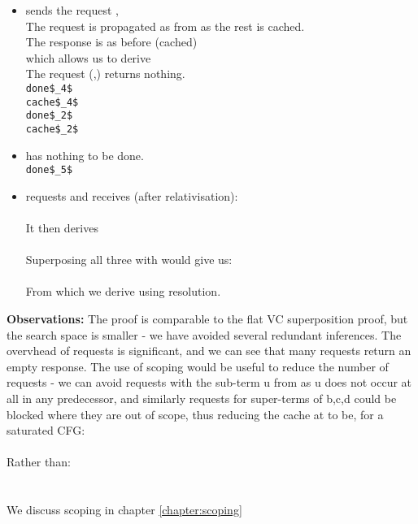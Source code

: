 \begin{itemize}
\item {} sends the request ,\\
The request is propagated as  from  as the rest is cached.\\
The response is as before (cached) \\
which allows us to derive \\
The request (,) returns nothing.\\
	\lstinline|done$_4$|\\
	\lstinline|cache$_4$|\\
	\lstinline|done$_2$|\\
	\lstinline|cache$_2$|
	
\item {} has nothing to be done.\\
	\lstinline|done$_5$|\m{= \emptyset}

\item {} requests  and receives (after relativisation):\\
\\
It then derives \\
\\
Superposing all three with  would give us:\\
\\
From which we derive \emptyClause{} using resolution.
\end{itemize}

\bigskip
\noindent
\textbf{Observations:}
The proof is comparable to the flat VC superposition proof, but the search space is smaller - 
we have avoided several redundant inferences. The overvhead of requests is significant, and we can see that many requests return an empty response. The use of scoping would be useful to reduce the number of requests - we can avoid requests with the sub-term u from  as 
u does not occur at all in any predecessor, and similarly requests for super-terms of b,c,d could be blocked where they are out of scope, 
thus reducing the cache at  to be, for a saturated CFG:\\
	\\
Rather than:\\
	\\
	\\
	We discuss scoping in chapter \ref{chapter:scoping}


